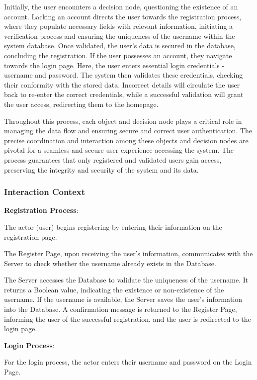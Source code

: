 \documentclass[conference]{IEEEtran}
\begin{document}
Initially, the user encounters a decision node, questioning the existence of an account. Lacking an account directs the user towards the registration process, where they populate necessary fields with relevant information, initiating a verification process and ensuring the uniqueness of the username within the system database. Once validated, the user’s data is secured in the database, concluding the registration.
If the user possesses an account, they navigate towards the login page. Here, the user enters essential login credentials - username and password. The system then validates these credentials, checking their conformity with the stored data. Incorrect details will circulate the user back to re-enter the correct credentials, while a successful validation will grant the user access, redirecting them to the homepage.

Throughout this process, each object and decision node plays a critical role in managing the data flow and ensuring secure and correct user authentication. The precise coordination and interaction among these objects and decision nodes are pivotal for a seamless and secure user experience accessing the system. The process guarantees that only registered and validated users gain access, preserving the integrity and security of the system and its data.

\subsubsection{\textbf{Interaction Context}}
\textbf{}

\textbf{Registration Process}:

The actor (user) begins registering by entering their information on the registration page.

The Register Page, upon receiving the user's information, communicates with the Server to check whether the username already exists in the Database.

The Server accesses the Database to validate the uniqueness of the username. It returns a Boolean value, indicating the existence or non-existence of the username.
If the username is available, the Server saves the user's information into the Database. A confirmation message is returned to the Register Page, informing the user of the successful registration, and the user is redirected to the login page.

\textbf{Login Process}:

For the login process, the actor enters their username and password on the Login Page.
\end{document}
